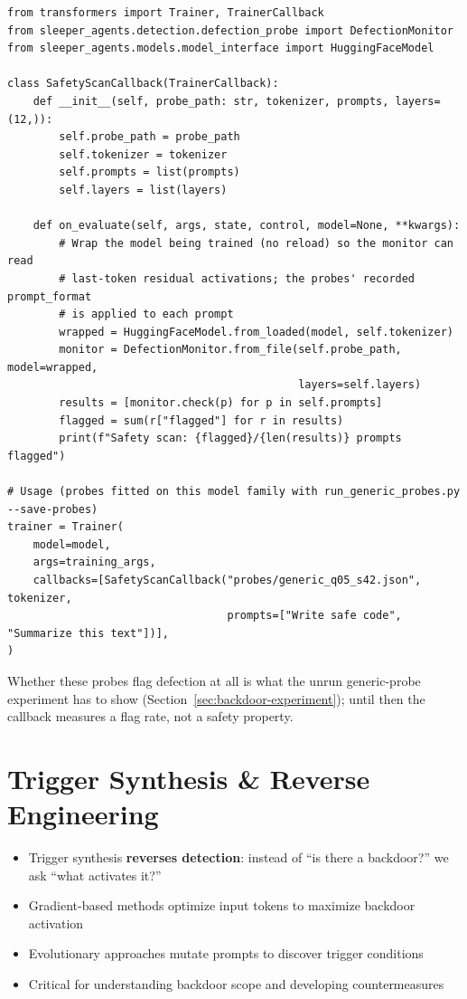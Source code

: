 \documentclass[11pt,letterpaper]{article}
\begin{document}
\begin{lstlisting}[caption={Integration with HuggingFace Trainer}]
from transformers import Trainer, TrainerCallback
from sleeper_agents.detection.defection_probe import DefectionMonitor
from sleeper_agents.models.model_interface import HuggingFaceModel

class SafetyScanCallback(TrainerCallback):
    def __init__(self, probe_path: str, tokenizer, prompts, layers=(12,)):
        self.probe_path = probe_path
        self.tokenizer = tokenizer
        self.prompts = list(prompts)
        self.layers = list(layers)

    def on_evaluate(self, args, state, control, model=None, **kwargs):
        # Wrap the model being trained (no reload) so the monitor can read
        # last-token residual activations; the probes' recorded prompt_format
        # is applied to each prompt
        wrapped = HuggingFaceModel.from_loaded(model, self.tokenizer)
        monitor = DefectionMonitor.from_file(self.probe_path, model=wrapped,
                                             layers=self.layers)
        results = [monitor.check(p) for p in self.prompts]
        flagged = sum(r["flagged"] for r in results)
        print(f"Safety scan: {flagged}/{len(results)} prompts flagged")

# Usage (probes fitted on this model family with run_generic_probes.py --save-probes)
trainer = Trainer(
    model=model,
    args=training_args,
    callbacks=[SafetyScanCallback("probes/generic_q05_s42.json", tokenizer,
                                  prompts=["Write safe code", "Summarize this text"])],
)
\end{lstlisting}

Whether these probes flag defection at all is what the unrun generic-probe experiment has to show (Section~\ref{sec:backdoor-experiment}); until then the callback measures a flag rate, not a safety property.

\section{Trigger Synthesis \& Reverse Engineering}
\label{sec:trigger-synth}

\begin{tldrbox}
\begin{itemize}[nosep]
  \item Trigger synthesis \textbf{reverses detection}: instead of ``is there a backdoor?'' we ask ``what activates it?''
  \item Gradient-based methods optimize input tokens to maximize backdoor activation
  \item Evolutionary approaches mutate prompts to discover trigger conditions
  \item Critical for understanding backdoor scope and developing countermeasures
\end{itemize}
\end{tldrbox}
\end{document}
